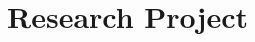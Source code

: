 \documentclass[../main.tex]{subfiles}
\begin{document}
    \section{Research Project}
        
        
        
\end{document}
